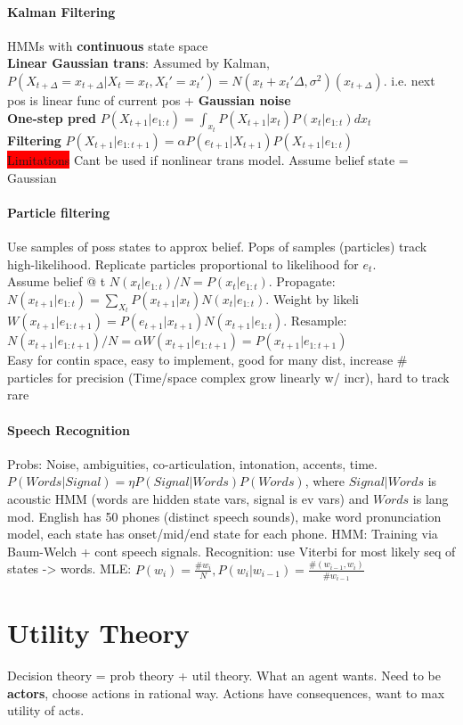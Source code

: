\paragraph{Kalman Filtering}
HMMs with \textbf{continuous} state space
\\ \textbf{Linear Gaussian trans}: Assumed by Kalman, $P(X_{t+\Delta} =
x_{t+\Delta}|X_t = x_t, X_t' = x_t') = N(x_t +
x_t'\Delta,\sigma^2)(x_{t+\Delta})$. i.e. next pos is linear func of
current pos + \textbf{Gaussian noise}
\\ \textbf{One-step pred}
$P(X_{t+1}|e_{1:t})=\int_{x_t}P(X_{t+1}|x_t)P(x_t|e_{1:t})dx_t$
\\ \textbf{Filtering} $P(X_{t+1}|e_{1:t+1})=\alpha P(e_{t+1}|X_{t+1})P(X_{t+1}|e_{1:t})$
\\ \colorbox{red}{Limitations} Cant be used if nonlinear trans
model. Assume belief state = Gaussian
\paragraph{Particle filtering} Use samples of poss states to approx
belief. Pops of samples (particles) track high-likelihood. Replicate
particles proportional to likelihood for $e_t$.
\\ Assume belief @ t $N(x_t|e_{1:t})/N = P(x_t | e_{1:t})$. Propagate:
$N(x_{t+1}|e_{1:t})=\sum_{X_t}P(x_{t+1}|x_t)N(x_t|e_{1:t})$. Weight by
likeli
$W(x_{t+1}|e_{1:t+1})=P(e_{t+1}|x_{t+1})N(x_{t+1}|e_{1:t})$. Resample:
$N(x_{t+1}|e_{1:t+1})/N =\alpha W(x_{t+1}|e_{1:t+1})
=P(x_{t+1}|e_{1:t+1})$
\\ Easy for contin space, easy to implement, good for many dist,
increase \# particles for precision (Time/space complex grow
linearly w/ incr), hard to track rare
\paragraph{Speech Recognition} Probs: Noise, ambiguities,
co-articulation, intonation, accents, time. $P(Words|Signal) = \eta
P(Signal|Words)P(Words)$, where $Signal|Words$ is acoustic HMM (words
are hidden state vars, signal is ev vars) and
$Words$ is lang mod. English has 50 phones (distinct speech sounds),
make word pronunciation model, each state has onset/mid/end state for
each phone. HMM: Training via Baum-Welch + cont speech
signals. Recognition: use Viterbi for most likely seq of states ->
words. MLE: $P(w_i)=\frac{\# w_i}{N}, P(w_i|w_{i-1})=\frac{\#
  (w_{i-1},w_i)}{\# w_{i-1}}$

\color[HTML]{0450FB}
\section{Utility Theory}
Decision theory = prob theory + util theory.
What an agent wants. Need to be \textbf{actors}, choose actions in
rational way. Actions have consequences, want to max utility of acts.
